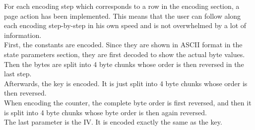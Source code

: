For each encoding step which corresponds to a row in the encoding section, a page action has been implemented. This means that the user can follow along each encoding step-by-step in his own speed and is not overwhelmed by a lot of information.\\
First, the constants are encoded. Since they are shown in ASCII format in the state parameters section, they are first decoded to show the actual byte values. Then the bytes are split into 4 byte chunks whose order is then reversed in the last step. \\
Afterwards, the key is encoded. It is just split into 4 byte chunks whose order is then reversed. \\
When encoding the counter, the complete byte order is first reversed, and then it is split into 4 byte chunks whose byte order is then again reversed. \\
The last parameter is the IV. It is encoded exactly the same as the key. \\

